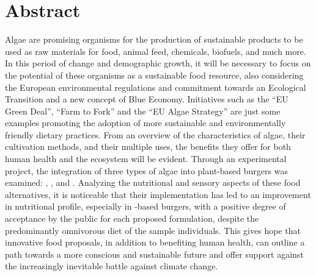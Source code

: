 
\section*{Abstract}
Algae are promising organisms for the production of sustainable products to be used as raw materials for food, animal feed, chemicals, biofuels, and much more. In this period of change and demographic growth, it will be necessary to focus on the potential of these organisms as a sustainable food resource, also considering the European environmental regulations and commitment towards an Ecological Transition and a new concept of Blue Economy.
Initiatives such as the “EU Green Deal”, “Farm to Fork” and the “EU Algae Strategy” are just some examples promoting the adoption of more sustainable and environmentally friendly dietary practices. %
From an overview of the characteristics of algae, their cultivation methods, and their multiple uses, the benefits they offer for both human health and the ecosystem will be evident. Through an experimental project, the integration of three types of algae into plant-based burgers was examined: , , and . Analyzing the nutritional and sensory aspects of these food alternatives, it is noticeable that their implementation has led to an improvement in nutritional profile, especially in -based burgers, with a positive degree of acceptance by the public for each proposed formulation, despite the predominantly omnivorous diet of the sample individuals. This gives hope that innovative food proposals, in addition to benefiting human health, can outline a path towards a more conscious and sustainable future and offer support against the increasingly inevitable battle against climate change.

